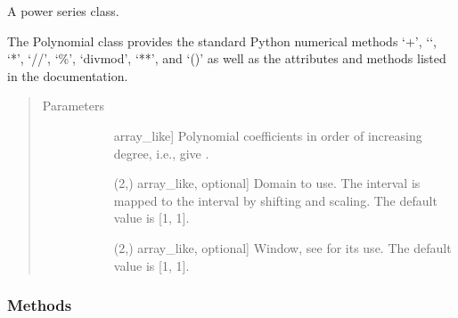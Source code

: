 \documentclass[letterpaper,10pt,english]{sphinxmanual}
\begin{document}
\begin{fulllineitems}
\label{\detokenize{generated/numpy.polynomial.Polynomial:numpy.polynomial.Polynomial}}
A power series class.

The Polynomial class provides the standard Python numerical methods
‘+’, ‘\sphinxhyphen{}‘, ‘*’, ‘//’, ‘\%’, ‘divmod’, ‘**’, and ‘()’ as well as the
attributes and methods listed in the  documentation.
\begin{quote}\begin{description}
\item[{Parameters}] \leavevmode\begin{description}
\item[{}] \leavevmode{[}array\_like{]}
Polynomial coefficients in order of increasing degree, i.e.,
 give .

\item[{}] \leavevmode{[}(2,) array\_like, optional{]}
Domain to use. The interval  is mapped
to the interval  by shifting and scaling.
The default value is {[}\sphinxhyphen{}1, 1{]}.

\item[{}] \leavevmode{[}(2,) array\_like, optional{]}
Window, see  for its use. The default value is {[}\sphinxhyphen{}1, 1{]}.


\end{description}

\end{description}\end{quote}
\subsubsection*{Methods}


\begin{savenotes}\sphinxatlongtablestart\begin{longtable}[c]{}
\hline


\end{longtable}
\end{savenotes}
\end{fulllineitems}
\end{document}
